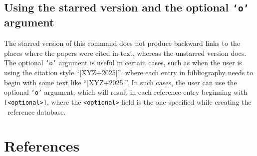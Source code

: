 \documentclass[letter, 11pt]{article}
\begin{document}
  \subsection*{Using the starred version and the optional \texttt{`o'} argument}
  The starred version of this command does not produce backward links to the places where the papers were cited in-text, whereas the unstarred version does. The optional \texttt{`o'} argument is useful in certain cases, such as when the user is using the citation style ``[XYZ+2025]'', where each entry in bibliography needs to begin with some text like ``[XYZ+2025]''. In such cases, the user can use the optional \texttt{`o'} argument, which will result in each reference entry beginning with \texttt{[<optional>]}, where the \texttt{<optional>} field is the one specified while creating the \dumbib\ reference database.
  \section*{References}
  \dumbibCreateBibliography
\end{document}

